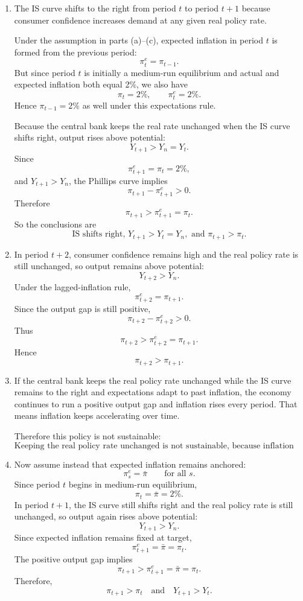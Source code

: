 \documentclass[12pt]{article}
\begin{document}
\begin{enumerate}[label=(\alph*)]
    \item
    The IS curve shifts to the right from period \(t\) to period \(t+1\) because consumer confidence increases demand at any given real policy rate.

    Under the assumption in parts (a)--(c), expected inflation in period \(t\) is formed from the previous period:
    \[
    \pi_t^e=\pi_{t-1}.
    \]
    But since period \(t\) is initially a medium-run equilibrium and actual and expected inflation both equal 2\%, we also have
    \[
    \pi_t=2\%,
    \qquad
    \pi_t^e=2\%.
    \]
    Hence \(\pi_{t-1}=2\%\) as well under this expectations rule.

    Because the central bank keeps the real rate unchanged when the IS curve shifts right, output rises above potential:
    \[
    Y_{t+1}>Y_n=Y_t.
    \]
    Since
    \[
    \pi_{t+1}^e=\pi_t=2\%,
    \]
    and \(Y_{t+1}>Y_n\), the Phillips curve implies
    \[
    \pi_{t+1}-\pi_{t+1}^e>0.
    \]
    Therefore
    \[
    \pi_{t+1}>\pi_{t+1}^e=\pi_t.
    \]
    So the conclusions are
    \[
    \boxed{\text{IS shifts right, }Y_{t+1}>Y_t=Y_n,\text{ and }\pi_{t+1}>\pi_t.}
    \]

    \item
    In period \(t+2\), consumer confidence remains high and the real policy rate is still unchanged, so output remains above potential:
    \[
    Y_{t+2}>Y_n.
    \]
    Under the lagged-inflation rule,
    \[
    \pi_{t+2}^e=\pi_{t+1}.
    \]
    Since the output gap is still positive,
    \[
    \pi_{t+2}-\pi_{t+2}^e>0.
    \]
    Thus
    \[
    \pi_{t+2}>\pi_{t+2}^e=\pi_{t+1}.
    \]
    Hence
    \[
    \boxed{\pi_{t+2}>\pi_{t+1}.}
    \]

    \item
    If the central bank keeps the real policy rate unchanged while the IS curve remains to the right and expectations adapt to past inflation, the economy continues to run a positive output gap and inflation rises every period. That means inflation keeps accelerating over time.

    Therefore this policy is not sustainable:
    \[
    \boxed{\text{Keeping the real policy rate unchanged is not sustainable, because inflation keeps rising.}}
    \]

    \item
    Now assume instead that expected inflation remains anchored:
    \[
    \pi_s^e=\bar{\pi}
    \qquad \text{for all } s.
    \]
    Since period \(t\) begins in medium-run equilibrium,
    \[
    \pi_t=\bar{\pi}=2\%.
    \]
    In period \(t+1\), the IS curve still shifts right and the real policy rate is still unchanged, so output again rises above potential:
    \[
    Y_{t+1}>Y_n.
    \]
    Since expected inflation remains fixed at target,
    \[
    \pi_{t+1}^e=\bar{\pi}=\pi_t.
    \]
    The positive output gap implies
    \[
    \pi_{t+1}>\pi_{t+1}^e=\bar{\pi}=\pi_t.
    \]
    Therefore,
    \[
    \boxed{\pi_{t+1}>\pi_t\quad\text{and}\quad Y_{t+1}>Y_t.}
    \]


\end{enumerate}
\end{document}
